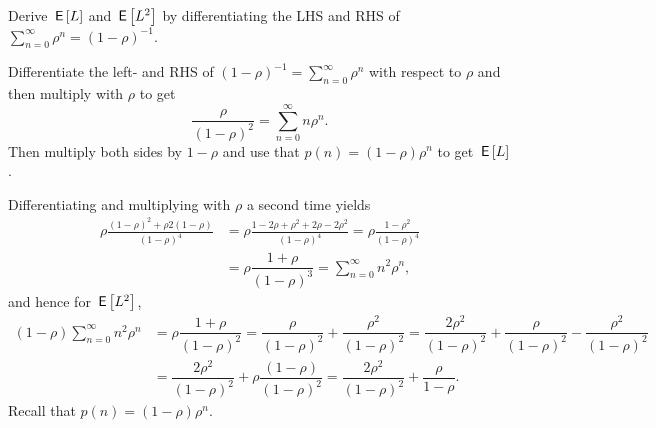 \begin{exercise}
Derive $\,\mathsf{E}\left[L\right]$ and $\,\mathsf{E}\left[L^2\right]$  by differentiating the  LHS and RHS of $\sum_{n=0}^{\infty}\rho^n = (1-\rho)^{-1}$.
\begin{solution}
  Differentiate the left- and RHS of $(1-\rho)^{-1} = \sum_{n=0}^\infty \rho^n$ with respect to $\rho$ and then multiply with $\rho$ to get
\begin{equation*}
\dfrac{\rho}{(1-\rho)^2}=\sum_{n=0}^{\infty}n\rho^n.
\end{equation*}
Then multiply both sides by $1-\rho$ and use that $p(n) = (1-\rho)\rho^n$ to get $\,\mathsf{E}\left[L\right]$.

Differentiating and multiplying with $\rho$ a second time yields
\begin{align*}
\rho \frac{(1-\rho)^2 + \rho2(1-\rho)}{(1-\rho)^4} &= \rho \frac{1-2\rho+\rho^2 + 2\rho-2\rho^2}{(1-\rho)^4} 
                                                     = \rho \frac{1-\rho^2}{(1-\rho)^4} \\
  &=\rho \dfrac{1+\rho}{(1-\rho)^3}=\sum_{n=0}^{\infty}n^2\rho^n,
\end{align*}
and hence for $\,\mathsf{E}\left[L^2\right]$,
\begin{align*}
  (1-\rho)\sum_{n=0}^{\infty}n^2\rho^n
  &= \rho\dfrac{1+\rho}{(1-\rho)^2}  = \dfrac{\rho}{(1-\rho)^2} + \dfrac{\rho^2}{(1-\rho)^2}
    = \dfrac{2\rho^2}{(1-\rho)^2} + \dfrac{\rho}{(1-\rho)^2} - \dfrac{\rho^2}{(1-\rho)^2} \\
  &= \dfrac{2\rho^2}{(1-\rho)^2} + \rho\dfrac{(1-\rho)}{(1-\rho)^2} = \dfrac{2\rho^2}{(1-\rho)^2} + \dfrac{\rho}{1-\rho}.
\end{align*}
Recall that $p(n) = (1-\rho)\rho^n$. 
\end{solution}
\end{exercise}




